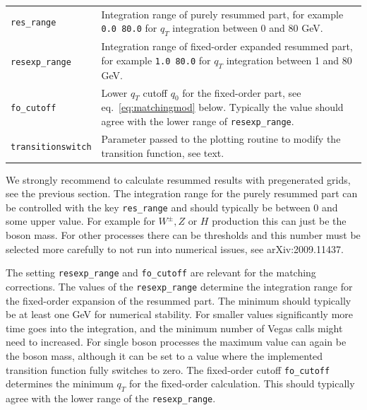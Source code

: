 \documentclass[
  11pt]{scrartcl}
\begin{document}
\begin{longtable}[]{@{}ll@{}}
\begin{minipage}[t]{0.24\columnwidth}
\texttt{res\_range}\strut
\end{minipage} & \begin{minipage}[t]{0.71\columnwidth}\raggedright
Integration range of purely resummed part, for example \texttt{0.0 80.0}
for \(q_T\) integration between 0 and 80 GeV.\strut
\end{minipage}\tabularnewline
\begin{minipage}[t]{0.24\columnwidth}\raggedright
\texttt{resexp\_range}\strut
\end{minipage} & \begin{minipage}[t]{0.71\columnwidth}\raggedright
Integration range of fixed-order expanded resummed part, for example
\texttt{1.0 80.0} for \(q_T\) integration between 1 and 80 GeV.\strut
\end{minipage}\tabularnewline
\begin{minipage}[t]{0.24\columnwidth}\raggedright
\texttt{fo\_cutoff}\strut
\end{minipage} & \begin{minipage}[t]{0.71\columnwidth}\raggedright
Lower \(q_T\) cutoff $q_0$ for the fixed-order part, see eq.~\eqref{eq:matchingmod} below. Typically the value should agree with the lower range of \texttt{resexp\_range}.\strut
\end{minipage}\tabularnewline
\begin{minipage}[t]{0.24\columnwidth}\raggedright
\texttt{transitionswitch}\strut
\end{minipage} & \begin{minipage}[t]{0.71\columnwidth}\raggedright
Parameter passed to the plotting routine to modify the transition
function, see text.\strut
\end{minipage}\tabularnewline
\bottomrule
\end{longtable}

We strongly recommend to calculate resummed results with pregenerated
grids, see the previous section.
The integration range for the purely resummed part can be controlled with the key
\texttt{res\_range} and should typically be between \(0\) and some upper
value. For example for \(W^\pm, Z\) or \(H\) production this can just be
the boson mass. For other processes there can be thresholds and this
number must be selected more carefully to not run into numerical issues,
see arXiv:2009.11437.

The setting \texttt{resexp\_range} and \texttt{fo\_cutoff} are relevant
for the matching corrections. The values of the \texttt{resexp\_range}
determine the integration range for the fixed-order expansion of the
resummed part. The minimum should typically be at least one GeV for
numerical stability. For smaller values significantly more time goes
into the integration, and the minimum number of Vegas calls might need
to increased. For single boson processes the maximum value can again be
the boson mass, although it can be set to a value where the implemented
transition function fully switches to zero. The fixed-order cutoff
\texttt{fo\_cutoff} determines the minimum \(q_T\) for the fixed-order
calculation. This should typically agree with the lower range of the
\texttt{resexp\_range}.
\end{document}
